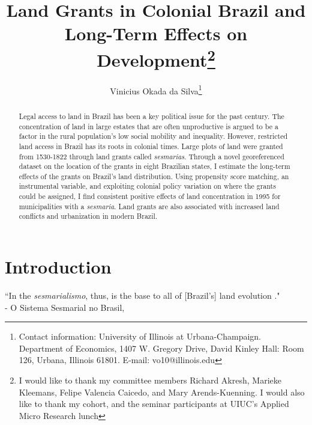 \documentclass[11pt]{article}
\title{Land Grants in Colonial Brazil and Long-Term Effects on Development\thanks{I would like to thank my committee members  Richard Akresh, Marieke Kleemans, Felipe Valencia Caicedo, and Mary Arends-Kuenning. I would also like to thank my cohort, and the seminar participants at UIUC's Applied Micro Research lunch}}
\author{Vinicius Okada da Silva\thanks{Contact information: University of Illinois at Urbana-Champaign. Department of Economics, 1407 W. Gregory Drive, David Kinley Hall: Room 126, Urbana, Illinois 61801. E-mail: vo10@illinois.edu}}
\affil{Department of Economics, University of Illinois at Urbana-Champaign}
\date{}
\begin{document}
\maketitle
\thispagestyle{empty} 

\begin{abstract}
  Legal access to land in Brazil has been a key political issue for the past century. The concentration of land in large estates that are often unproductive is argued to be a factor in the rural population's low social mobility and inequality. However, restricted land access in Brazil has its roots in colonial times. Large plots of land were granted from 1530-1822 through land grants called \textit{sesmarias}. 
  Through a novel georeferenced dataset on the location of the grants in eight Brazilian states, I estimate the long-term effects of the grants on Brazil's land distribution. 
  Using propensity score matching, an instrumental variable, and exploiting colonial policy variation on where the grants could be assigned, I find consistent positive effects of land concentration in 1995 for municipalities with a \textit{sesmaria}.
  Land grants are also associated with increased land conflicts and urbanization in modern Brazil.
\end{abstract}

\clearpage
{} 

\section{Introduction}

\begin{displayquote}
  ``In the \textit{sesmarialismo}, thus, is the base to all of [Brazil's] land evolution ."
  \\ 
  \smallskip
  - O Sistema Sesmarial no Brasil, \textcite[p.~25]{Da_Costa_Porto1979-dz}
  \end{displayquote}
\end{document}
